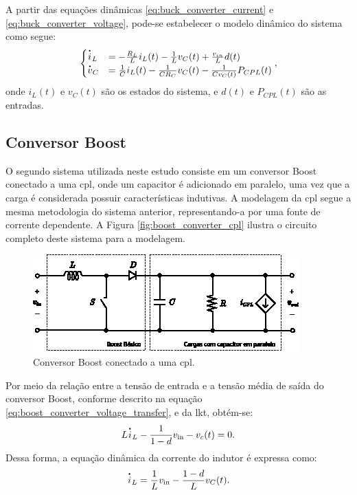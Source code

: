 A partir das equações dinâmicas \eqref{eq:buck_converter_current} e \eqref{eq:buck_converter_voltage}, pode-se estabelecer o modelo dinâmico do sistema como segue: \begin{equation}\begin{cases} \dt{i}_L &=  - \frac{R_L}{L} i_L(t) - \frac{1}{L} v_C(t) + \frac{v_{in}}{L}d(t)  \\ \dt{v}_C &= \frac{1}{C} i_L(t) - \frac{1}{C R_C} v_C(t) - \frac{1}{C v_C(t)} P_{CPL}(t) \label{eq:buck_nonlinear_system} \end{cases}, \end{equation} onde $i_L(t)$ e $v_C(t)$ são os estados do sistema, e $d(t)$ e $P_{CPL}(t)$ são as entradas.

\subsection{Conversor Boost}

O segundo sistema utilizada neste estudo consiste em um conversor Boost conectado a uma \acrshort{cpl}, onde um capacitor é adicionado em paralelo, uma vez que a carga é considerada possuir características indutivas. A modelagem da \acrshort{cpl} segue a mesma metodologia do sistema anterior, representando-a por uma fonte de corrente dependente. A Figura \autoref{fig:boost_converter_cpl} ilustra o circuito completo deste sistema para a modelagem.

\begin{figure}[H]
  \centering
  \includegraphics[width=.73\textwidth]{figuras/boost_converter_cpl.eps}
  \caption{Conversor Boost conectado a uma \acrshort{cpl}.}
  \label{fig:boost_converter_cpl}
\end{figure}

Por meio da relação entre a tensão de entrada e a tensão média de saída do conversor Boost, conforme descrito na equação \eqref{eq:boost_converter_voltage_transfer}, e da \acrshort{lkt}, obtém-se: \begin{equation} L \dt{i}_L - \frac{1}{1-d} v_{\text{in}} - v_c(t) = 0. \end{equation} Dessa forma, a equação dinâmica da corrente do indutor é expressa como: \begin{equation} \dt{i}_L = \frac{1}{L}v_{\text{in}} - \frac{1-d}{L}v_C(t) \label{eq:boost_converter_current}. \end{equation}


